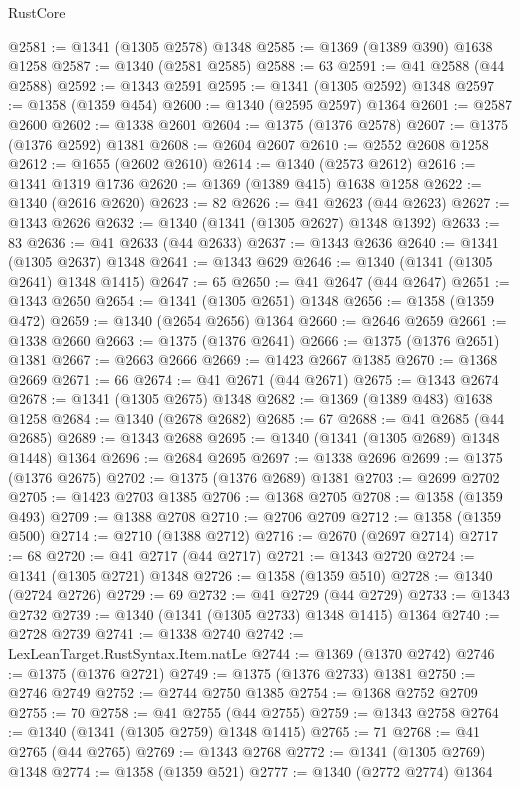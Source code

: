 \begin{lexlean}{RustCore}
\begin{coremodule}
@2581 := @1341 (@1305 @2578) @1348
@2585 := @1369 (@1389 @390) @1638 @1258
@2587 := @1340 (@2581 @2585)
@2588 := 63
@2591 := @41 @2588 (@44 @2588)
@2592 := @1343 @2591
@2595 := @1341 (@1305 @2592) @1348
@2597 := @1358 (@1359 @454)
@2600 := @1340 (@2595 @2597) @1364
@2601 := @2587 @2600
@2602 := @1338 @2601
@2604 := @1375 (@1376 @2578)
@2607 := @1375 (@1376 @2592) @1381
@2608 := @2604 @2607
@2610 := @2552 @2608 @1258
@2612 := @1655 (@2602 @2610)
@2614 := @1340 (@2573 @2612)
@2616 := @1341 @1319 @1736
@2620 := @1369 (@1389 @415) @1638 @1258
@2622 := @1340 (@2616 @2620)
@2623 := 82
@2626 := @41 @2623 (@44 @2623)
@2627 := @1343 @2626
@2632 := @1340 (@1341 (@1305 @2627) @1348 @1392)
@2633 := 83
@2636 := @41 @2633 (@44 @2633)
@2637 := @1343 @2636
@2640 := @1341 (@1305 @2637) @1348
@2641 := @1343 @629
@2646 := @1340 (@1341 (@1305 @2641) @1348 @1415)
@2647 := 65
@2650 := @41 @2647 (@44 @2647)
@2651 := @1343 @2650
@2654 := @1341 (@1305 @2651) @1348
@2656 := @1358 (@1359 @472)
@2659 := @1340 (@2654 @2656) @1364
@2660 := @2646 @2659
@2661 := @1338 @2660
@2663 := @1375 (@1376 @2641)
@2666 := @1375 (@1376 @2651) @1381
@2667 := @2663 @2666
@2669 := @1423 @2667 @1385
@2670 := @1368 @2669
@2671 := 66
@2674 := @41 @2671 (@44 @2671)
@2675 := @1343 @2674
@2678 := @1341 (@1305 @2675) @1348
@2682 := @1369 (@1389 @483) @1638 @1258
@2684 := @1340 (@2678 @2682)
@2685 := 67
@2688 := @41 @2685 (@44 @2685)
@2689 := @1343 @2688
@2695 := @1340 (@1341 (@1305 @2689) @1348 @1448) @1364
@2696 := @2684 @2695
@2697 := @1338 @2696
@2699 := @1375 (@1376 @2675)
@2702 := @1375 (@1376 @2689) @1381
@2703 := @2699 @2702
@2705 := @1423 @2703 @1385
@2706 := @1368 @2705
@2708 := @1358 (@1359 @493)
@2709 := @1388 @2708
@2710 := @2706 @2709
@2712 := @1358 (@1359 @500)
@2714 := @2710 (@1388 @2712)
@2716 := @2670 (@2697 @2714)
@2717 := 68
@2720 := @41 @2717 (@44 @2717)
@2721 := @1343 @2720
@2724 := @1341 (@1305 @2721) @1348
@2726 := @1358 (@1359 @510)
@2728 := @1340 (@2724 @2726)
@2729 := 69
@2732 := @41 @2729 (@44 @2729)
@2733 := @1343 @2732
@2739 := @1340 (@1341 (@1305 @2733) @1348 @1415) @1364
@2740 := @2728 @2739
@2741 := @1338 @2740
@2742 := LexLeanTarget.RustSyntax.Item.natLe
@2744 := @1369 (@1370 @2742)
@2746 := @1375 (@1376 @2721)
@2749 := @1375 (@1376 @2733) @1381
@2750 := @2746 @2749
@2752 := @2744 @2750 @1385
@2754 := @1368 @2752 @2709
@2755 := 70
@2758 := @41 @2755 (@44 @2755)
@2759 := @1343 @2758
@2764 := @1340 (@1341 (@1305 @2759) @1348 @1415)
@2765 := 71
@2768 := @41 @2765 (@44 @2765)
@2769 := @1343 @2768
@2772 := @1341 (@1305 @2769) @1348
@2774 := @1358 (@1359 @521)
@2777 := @1340 (@2772 @2774) @1364

\end{coremodule}
\end{lexlean}
